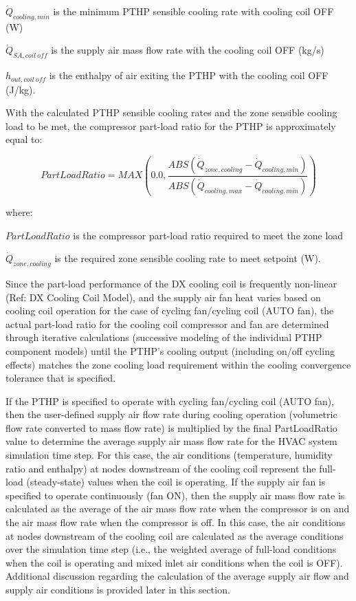 \(\dot{Q}_{cooling,min}\) is the minimum PTHP sensible cooling rate with cooling coil OFF (W)

\(\dot{Q}_{SA,coil~off}\) is the supply air mass flow rate with the cooling coil OFF (kg/s)

\(h_{out,coil~off}\) is the enthalpy of air exiting the PTHP with the cooling coil OFF (J/kg).

With the calculated PTHP sensible cooling rates and the zone sensible cooling load to be met, the compressor part-load ratio for the PTHP is approximately equal to:

\begin{equation}
  PartLoadRatio = MAX \left( 0.0, \frac{ABS \left( \dot{Q}_{zone,cooling} - \dot{Q}_{cooling,min} \right)}{ABS \left( \dot{Q}_{cooling,max} - \dot{Q}_{cooling,min} \right)} \right)
\end{equation}

where:

\(PartLoadRatio\) is the compressor part-load ratio required to meet the zone load

\(\dot{Q}_{zone,cooling}\) is the required zone sensible cooling rate to meet setpoint (W).

Since the part-load performance of the DX cooling coil is frequently non-linear (Ref: DX Cooling Coil Model), and the supply air fan heat varies based on cooling coil operation for the case of cycling fan/cycling coil (AUTO fan), the actual part-load ratio for the cooling coil compressor and fan are determined through iterative calculations (successive modeling of the individual PTHP component models) until the PTHP's cooling output (including on/off cycling effects) matches the zone cooling load requirement within the cooling convergence tolerance that is specified.

If the PTHP is specified to operate with cycling fan/cycling coil (AUTO fan), then the user-defined supply air flow rate during cooling operation (volumetric flow rate converted to mass flow rate) is multiplied by the final PartLoadRatio value to determine the average supply air mass flow rate for the HVAC system simulation time step. For this case, the air conditions (temperature, humidity ratio and enthalpy) at nodes downstream of the cooling coil represent the full-load (steady-state) values when the coil is operating. If the supply air fan is specified to operate continuously (fan ON), then the supply air mass flow rate is calculated as the average of the air mass flow rate when the compressor is on and the air mass flow rate when the compressor is off. In this case, the air conditions at nodes downstream of the cooling coil are calculated as the average conditions over the simulation time step (i.e., the weighted average of full-load conditions when the coil is operating and mixed inlet air conditions when the coil is OFF). Additional discussion regarding the calculation of the average supply air flow and supply air conditions is provided later in this section.

